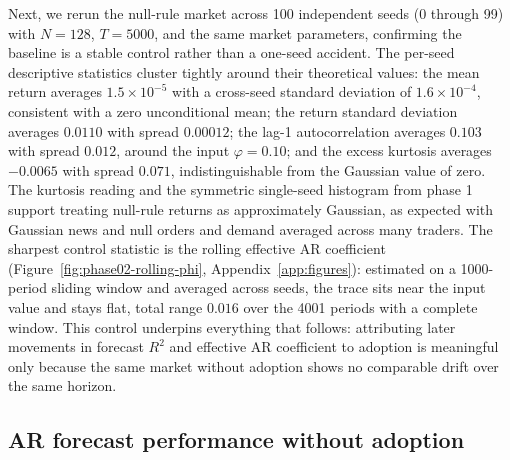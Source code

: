 \documentclass[12pt]{article}
\begin{document}
Next, we rerun the null-rule market across 100 independent seeds (0 through 99) with $N=128$, $T=5000$, and the same market parameters, confirming the baseline is a stable control rather than a one-seed accident. %
The per-seed descriptive statistics cluster tightly around their theoretical values: the mean return averages $1.5\times10^{-5}$ with a cross-seed standard deviation of $1.6\times10^{-4}$, consistent with a zero unconditional mean; %
the return standard deviation averages $0.0110$ with spread $0.00012$; %
the lag-1 autocorrelation averages $0.103$ with spread $0.012$, around the input $\varphi=0.10$; %
and the excess kurtosis averages $-0.0065$ with spread $0.071$, indistinguishable from the Gaussian value of zero. %
The kurtosis reading and the symmetric single-seed histogram from phase 1 support treating null-rule returns as approximately Gaussian, as expected with Gaussian news and null orders and demand averaged across many traders. %
The sharpest control statistic is the rolling effective AR coefficient (Figure~\ref{fig:phase02-rolling-phi}, Appendix~\ref{app:figures}): estimated on a 1000-period sliding window and averaged across seeds, the trace sits near the input value and stays flat, total range $0.016$ over the 4001 periods with a complete window. %
This control underpins everything that follows: attributing later movements in forecast $R^{2}$ and effective AR coefficient to adoption is meaningful only because the same market without adoption shows no comparable drift over the same horizon.

\subsection{AR forecast performance without adoption}\label{sec:phase3-results}
\end{document}
